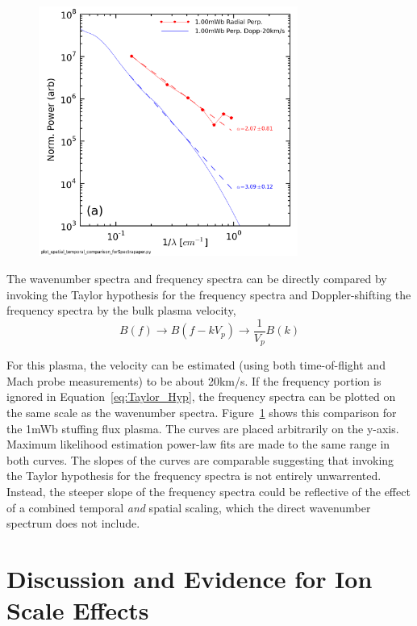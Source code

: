 \documentclass[aip,prl,amsmath,amssymb,reprint,superscriptaddress]{revtex4-1} %
\begin{document}
\begin{figure}[!htbp]
\centerline{
\includegraphics[width=8.5cm]{B_spatial_temporal_comp_wFits_40t60us}}
\caption{\label{fig:wavenumber_comp}}
\end{figure}

The wavenumber spectra and frequency spectra can be directly compared by invoking the Taylor hypothesis for the frequency spectra and Doppler-shifting the frequency spectra by the bulk plasma velocity,
\begin{equation}
B(f) \longrightarrow B(f-kV_{p}) \longrightarrow \frac{1}{V_{p}}B(k)
\label{eq:Taylor_Hyp}
\end{equation}

For this plasma, the velocity can be estimated (using both time-of-flight and Mach probe measurements) to be about 20km/s. If the frequency portion is ignored in Equation~\ref{eq:Taylor_Hyp}, the frequency spectra can be plotted on the same scale as the wavenumber spectra. Figure~\ref{fig:wavenumber_comp} shows this comparison for the 1mWb stuffing flux plasma. The curves are placed arbitrarily on the y-axis. Maximum likelihood estimation power-law fits are made to the same range in both curves. The slopes of the curves are comparable suggesting that invoking the Taylor hypothesis for the frequency spectra is not entirely unwarrented. Instead, the steeper slope of the frequency spectra could be reflective of the effect of a combined temporal {\it and} spatial scaling, which the direct wavenumber spectrum does not include.

\section{Discussion and Evidence for Ion Scale Effects}
\end{document}
